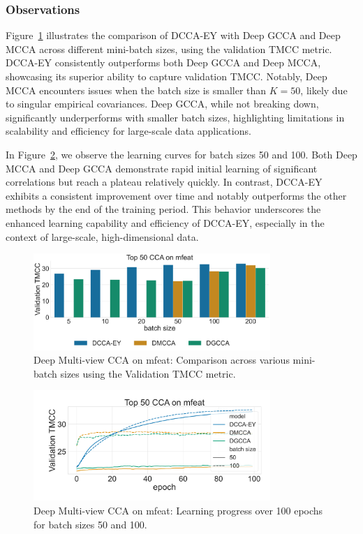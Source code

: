 \subsubsection{Observations}
Figure~\ref{fig:dmcca_corr} illustrates the comparison of DCCA-EY with Deep GCCA and Deep MCCA across different mini-batch sizes, using the validation TMCC metric.
DCCA-EY consistently outperforms both Deep GCCA and Deep MCCA, showcasing its superior ability to capture validation TMCC. Notably, Deep MCCA encounters issues when the batch size is smaller than $K=50$, likely due to singular empirical covariances.
Deep GCCA, while not breaking down, significantly underperforms with smaller batch sizes, highlighting limitations in scalability and efficiency for large-scale data applications.

In Figure~\ref{fig:dmcca_lr}, we observe the learning curves for batch sizes 50 and 100. Both Deep MCCA and Deep GCCA demonstrate rapid initial learning of significant correlations but reach a plateau relatively quickly. In contrast, DCCA-EY exhibits a consistent improvement over time and notably outperforms the other methods by the end of the training period. This behavior underscores the enhanced learning capability and efficiency of DCCA-EY, especially in the context of large-scale, high-dimensional data.

\begin{figure}
    \centering
    \includegraphics[width=0.8\textwidth]{figures/DMCCA/mfeat_models_different_batch_sizes}
    \caption{Deep Multi-view CCA on mfeat: Comparison across various mini-batch sizes using the Validation TMCC metric.}\label{fig:dmcca_corr}
\end{figure}

\begin{figure}
    \centering
    \includegraphics[width=0.8\textwidth]{figures/DMCCA/mfeat_allbatchsizes_pcc}
    \caption{Deep Multi-view CCA on mfeat: Learning progress over 100 epochs for batch sizes 50 and 100.}\label{fig:dmcca_lr}
\end{figure}

